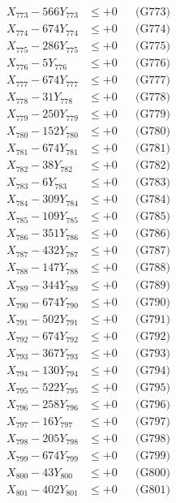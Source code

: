 \documentclass[a4paper,10pt]{article}
\begin{document}
{\begin{align}
X_{773} - 566Y_{773} &\leq +0 && \text{(G773)} \\
X_{774} - 674Y_{774} &\leq +0 && \text{(G774)} \\
X_{775} - 286Y_{775} &\leq +0 && \text{(G775)} \\
X_{776} - 5Y_{776} &\leq +0 && \text{(G776)} \\
X_{777} - 674Y_{777} &\leq +0 && \text{(G777)} \\
X_{778} - 31Y_{778} &\leq +0 && \text{(G778)} \\
X_{779} - 250Y_{779} &\leq +0 && \text{(G779)} \\
X_{780} - 152Y_{780} &\leq +0 && \text{(G780)} \\
\allowbreak
X_{781} - 674Y_{781} &\leq +0 && \text{(G781)} \\
X_{782} - 38Y_{782} &\leq +0 && \text{(G782)} \\
X_{783} - 6Y_{783} &\leq +0 && \text{(G783)} \\
X_{784} - 309Y_{784} &\leq +0 && \text{(G784)} \\
X_{785} - 109Y_{785} &\leq +0 && \text{(G785)} \\
X_{786} - 351Y_{786} &\leq +0 && \text{(G786)} \\
X_{787} - 432Y_{787} &\leq +0 && \text{(G787)} \\
X_{788} - 147Y_{788} &\leq +0 && \text{(G788)} \\
X_{789} - 344Y_{789} &\leq +0 && \text{(G789)} \\
X_{790} - 674Y_{790} &\leq +0 && \text{(G790)} \\
\allowbreak
X_{791} - 502Y_{791} &\leq +0 && \text{(G791)} \\
X_{792} - 674Y_{792} &\leq +0 && \text{(G792)} \\
X_{793} - 367Y_{793} &\leq +0 && \text{(G793)} \\
X_{794} - 130Y_{794} &\leq +0 && \text{(G794)} \\
X_{795} - 522Y_{795} &\leq +0 && \text{(G795)} \\
X_{796} - 258Y_{796} &\leq +0 && \text{(G796)} \\
X_{797} - 16Y_{797} &\leq +0 && \text{(G797)} \\
X_{798} - 205Y_{798} &\leq +0 && \text{(G798)} \\
X_{799} - 674Y_{799} &\leq +0 && \text{(G799)} \\
X_{800} - 43Y_{800} &\leq +0 && \text{(G800)} \\
\allowbreak
X_{801} - 402Y_{801} &\leq +0 && \text{(G801)} \\

\end{align}}
\end{document}
